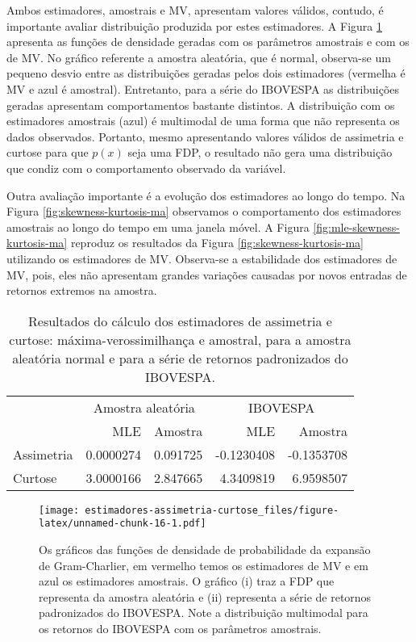 \documentclass[]{article}
\begin{document}
Ambos estimadores, amostrais e MV, apresentam valores válidos, contudo,
é importante avaliar distribuição produzida por estes estimadores. A
Figura \ref{fig:gc-dist} apresenta as funções de densidade geradas com
os parâmetros amostrais e com os de MV. No gráfico referente a amostra
aleatória, que é normal, observa-se um pequeno desvio entre as
distribuições geradas pelos dois estimadores (vermelha é MV e azul é
amostral). Entretanto, para a série do IBOVESPA as distribuições geradas
apresentam comportamentos bastante distintos. A distribuição com os
estimadores amostrais (azul) é multimodal de uma forma que não
representa os dados observados. Portanto, mesmo apresentando valores
válidos de assimetria e curtose para que \(p(x)\) seja uma FDP, o
resultado não gera uma distribuição que condiz com o comportamento
observado da variável.

Outra avaliação importante é a evolução dos estimadores ao longo do
tempo. Na Figura \ref{fig:skewness-kurtosis-ma} observamos o
comportamento dos estimadores amostrais ao longo do tempo em uma janela
móvel. A Figura \ref{fig:mle-skewness-kurtosis-ma} reproduz os
resultados da Figura \ref{fig:skewness-kurtosis-ma} utilizando os
estimadores de MV. Observa-se a estabilidade dos estimadores de MV,
pois, eles não apresentam grandes variações causadas por novos entradas
de retornos extremos na amostra.

\begin{table}

\caption{\label{tab:unnamed-chunk-14}\label{tab:mv-results} Resultados do cálculo dos estimadores de assimetria e curtose: máxima-verossimilhança e amostral, para a amostra aleatória normal e para a série de retornos padronizados do IBOVESPA.}
\centering
\begin{tabular}[t]{lrrrr}
\toprule
\multicolumn{1}{c}{ } & \multicolumn{2}{c}{Amostra aleatória} & \multicolumn{2}{c}{IBOVESPA} \\
\cmidrule(l{2pt}r{2pt}){2-3} \cmidrule(l{2pt}r{2pt}){4-5}
  & MLE & Amostra & MLE & Amostra\\
\midrule
Assimetria & 0.0000274 & 0.091725 & -0.1230408 & -0.1353708\\
Curtose & 3.0000166 & 2.847665 & 4.3409819 & 6.9598507\\
\bottomrule
\end{tabular}
\end{table}

\begin{figure}
\centering
\texttt{[image: estimadores-assimetria-curtose\_files/figure-latex/unnamed-chunk-16-1.pdf]}
\caption{\label{fig:gc-dist} Os gráficos das funções de densidade de
probabilidade da expansão de Gram-Charlier, em vermelho temos os
estimadores de MV e em azul os estimadores amostrais. O gráfico (i) traz
a FDP que representa da amostra aleatória e (ii) representa a série de
retornos padronizados do IBOVESPA. Note a distribuição multimodal para
os retornos do IBOVESPA com os parâmetros amostrais.}
\end{figure}
\end{document}
